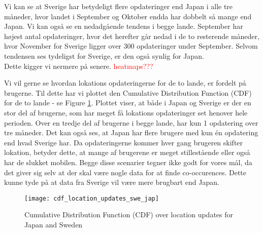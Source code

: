 Vi kan se at Sverige har betydeligt flere opdateringer end Japan i alle tre måneder, hvor landet i September og Oktober endda har dobbelt så mange end Japan. Vi kan også se en nedadgående tendens i begge lande. September har højest antal opdateringer, hvor det herefter går nedad i de to resterende måneder, hvor November for Sverige ligger over 300 opdateringer under September. Selvom tendensen ses tydeligst for Sverige, er den også synlig for Japan. \\
Dette kigger vi nermere på senere. \textcolor{red}{heatmaps???}

Vi vil gerne se hvordan lokations opdateringerne for de to lande, er fordelt på brugerne. Til dette har vi plottet den Cumulative Distribution Function (CDF) for de to lande - se Figure \ref{fig:country_cdf}. 
Plottet viser, at både i Japan og Sverige er der en stor del af brugerne, som har meget få lokations opdateringer set henover hele perioden. Over en tredje del af brugerne i begge lande, har kun 1 opdatering over tre måneder. Det kan også ses, at Japan har flere brugere med kun én opdatering end hvad Sverige har. 
Da opdateringerne kommer hver gang brugeren skifter lokation, betyder dette, at mange af brugerene er meget stillestående eller også har de slukket mobilen. Begge disse scenarier tegner ikke godt for vores mål, da det giver sig selv at der skal være nogle data for at finde co-occurences. 
Dette kunne tyde på at data fra Sverige vil være mere brugbart end Japan. 





\begin{figure}[H]
    \centering
    \texttt{[image: cdf\_location\_updates\_swe\_jap]}
    \caption{Cumulative Distribution Function (CDF) over location updates for Japan and Sweden}
    \label{fig:country_cdf}
\end{figure}

